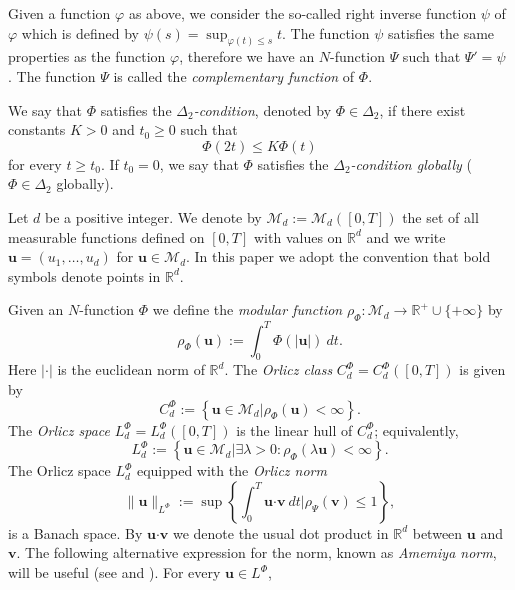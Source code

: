 \documentclass[twoside]{article}
\theoremstyle{remark}
\newcommand{\orlnor}{\|_{L^{\Phi}}}
\newcommand{\lphi}{L^{\Phi}}
\newcommand{\claseor}{C^{\Phi}}
\renewcommand{\b}[1]{\boldsymbol{#1}}
\renewcommand{\leq}{\leqslant}
\begin{document}
Given a function $\varphi$ as above, we  consider the so-called right inverse function $\psi$ of $\varphi$ which is 
defined by $\psi(s)=\sup_{\varphi(t)\leq s}t$.
The function $\psi$ satisfies the same properties as the function $\varphi$, therefore we have an $N$-function $\Psi$ such that $\Psi'=\psi$ .
 The function $\Psi$ is called the \emph{complementary function} of $\Phi$.


We say that $\Phi$ satisfies the  \emph{$\Delta_2$-condition}, denoted by $\Phi \in \Delta_2$, 
if there exist  constants $K>0$ and  $t_0\geq 0$ such that 
\begin{equation}\label{delta2defi}\Phi(2t)\leq K\Phi(t)
\end{equation}
for every $t\geq t_0$. 
If $t_0=0$,  we say that $\Phi$ satisfies the \emph{$\Delta_2$-condition globally} ($\Phi \in \Delta_2$ globally).  


Let $d$ be a positive integer. We denote by $\mathcal{M}_d:=\mathcal{M}_d([0,T])$ the set of all measurable functions defined on $[0,T]$ with values on $\mathbb{R}^d$ and  we write $\b{u}=(u_1,\dots,u_d)$ for  $\b{u}\in \mathcal{M}_d$.
In this paper we adopt the convention that bold symbols denote points in $\mathbb{R}^d$.


Given  an $N$-function $\Phi$ we define the \emph{modular function} 
$\rho_{\Phi}:\mathcal{M}_d\to \mathbb{R}^+\cup\{+\infty\}$ by
\[\rho_{\Phi}(\b{u}):= \int_0^T \Phi(|\b{u}|)\ dt.\]
Here $|\cdot|$ is the euclidean norm of $\mathbb{R}^d$.
The \emph{Orlicz class} $C_d^{\Phi}=C_d^{\Phi}([0,T])$  is given  by
\begin{equation}\label{claseOrlicz}
  C^{\Phi}_d:=\left\{\b{u}\in \mathcal{M}_d | \rho_{\Phi}(\b{u})< \infty \right\}.
\end{equation}
The \emph{Orlicz space} $\lphi_d=L^{\Phi}_d([0,T])$ is the linear hull of $\claseor_d$;
equivalently,
\begin{equation}\label{espacioOrlicz}
\lphi_d:=\left\{ \b{u}\in \mathcal{M}_d | \exists \lambda>0: \rho_{\Phi}(\lambda \b{u}) < \infty   \right\}.
\end{equation}
  The Orlicz space $\lphi_d$ equipped with the \emph{Orlicz norm}
\[
\|  \b{u}  \orlnor:=\sup \left\{  \int_0^T \b{u}\b{\cdot} \b{v}\ dt \big| \rho_{\Psi}(\b{v})\leq 1\right\},
\]
is a Banach space. By $\b{u}\b{\cdot} \b{v}$ we denote the usual dot product in $\mathbb{R}^{d}$ between $\b{u}$ and $\b{v}$.  
The following alternative expression for the norm, known as \emph{Amemiya norm},     will  be useful (see \cite[Thm. 10.5]{KR} and \cite{hudzik2000amemiya}). For every $\b{u}\in\lphi$,
\end{document}
